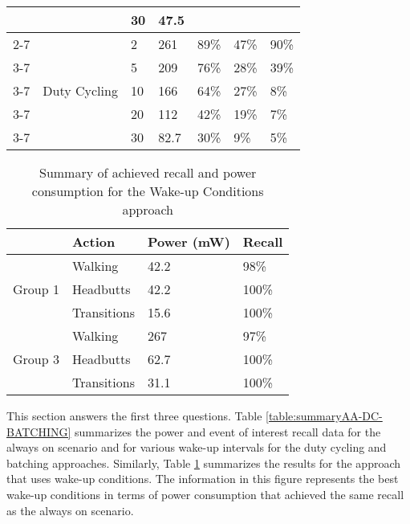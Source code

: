 \begin{table*}[t]
\begin{tabular}{|l|l|l|l|l|l|l|}
								& 								& 30		& 47.5		&						&							&							\\ \cline{2-7}
								& \multirow{5}{*}{Duty Cycling}	& 2			& 261		& 89\%					& 47\%						& 90\%						\\ \cline{3-7}
								& 								& 5			& 209		& 76\%					& 28\%						& 39\%						\\ \cline{3-7}
								& 								& 10		& 166		& 64\%					& 27\%						& 8\%						\\ \cline{3-7}
								& 								& 20		& 112		& 42\%					& 19\%						& 7\%						\\ \cline{3-7}
								& 								& 30		& 82.7		& 30\%					& 9\%						& 5\%						\\ \hline
    \end{tabular}
	\caption{Summary of achieved recall and power consumption for the Always On, Duty Cycling and Batching approaches}
	\label{table:summaryAA-DC-BATCHING}
\end{table*}

\begin{table}[t]
    \begin{tabular}{|l|l|l|l|}
	\hline
    ~       					& Action      & Power (mW) & Recall \\ \hline
    \multirow{3}{*}{Group 1} 	& Walking     & 42.2       & 98\%   \\ \cline{2-4}
								& Headbutts   & 42.2       & 100\%  \\ \cline{2-4}
								& Transitions & 15.6       & 100\%  \\ \hline
    \multirow{3}{*}{Group 3} 	& Walking     & 267        & 97\%   \\ \cline{2-4}
								& Headbutts   & 62.7       & 100\%  \\ \cline{2-4}
								& Transitions & 31.1       & 100\%  \\ \hline
    \end{tabular}
	\caption{Summary of achieved recall and power consumption for the Wake-up Conditions approach}
	\label{table:summaryWUC}
\end{table}

This section answers the first three questions. Table \ref{table:summaryAA-DC-BATCHING} summarizes the power and event of interest recall data for the always on scenario and for various wake-up intervals for the duty cycling and batching approaches. Similarly, Table \ref{table:summaryWUC} summarizes the results for the approach that uses wake-up conditions. The information in this figure represents the best wake-up conditions in terms of power consumption that achieved the same recall as the always on scenario.

